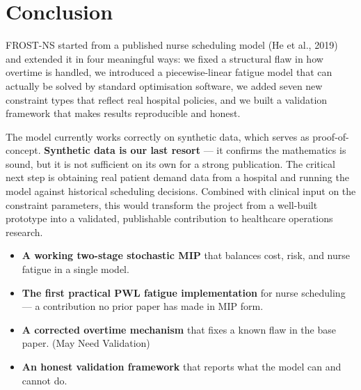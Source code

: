 \documentclass[12pt,a4paper]{article}
\begin{document}
\newpage
\section{Conclusion}

FROST-NS started from a published nurse scheduling model (He et al., 2019) and extended it in four meaningful ways: we fixed a structural flaw in how overtime is handled, we introduced a piecewise-linear fatigue model that can actually be solved by standard optimisation software, we added seven new constraint types that reflect real hospital policies, and we built a validation framework that makes results reproducible and honest.

The model currently works correctly on synthetic data, which serves as proof-of-concept. \textbf{Synthetic data is our last resort} — it confirms the mathematics is sound, but it is not sufficient on its own for a strong publication. The critical next step is obtaining real patient demand data from a hospital and running the model against historical scheduling decisions. Combined with clinical input on the constraint parameters, this would transform the project from a well-built prototype into a validated, publishable contribution to healthcare operations research.

\begin{contribbox}
\begin{itemize}[itemsep=5pt]
  \item \textbf{A working two-stage stochastic MIP} that balances cost, risk, and nurse fatigue in a single model.
  \item \textbf{The first practical PWL fatigue implementation} for nurse scheduling — a contribution no prior paper has made in MIP form.
  \item \textbf{A corrected overtime mechanism} that fixes a known flaw in the base paper. (May Need Validation)
  \item \textbf{An honest validation framework} that reports what the model can and cannot do.
\end{itemize}
\end{contribbox}
\end{document}
